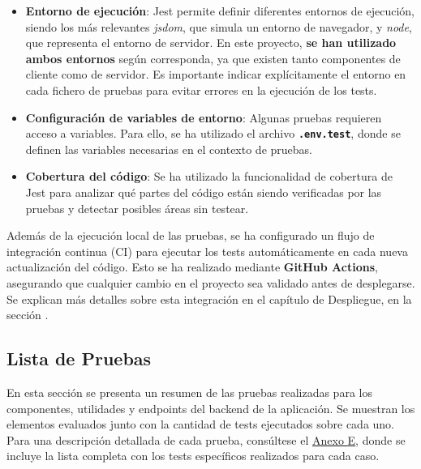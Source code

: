 \begin{itemize}
    \item \textbf{Entorno de ejecución}: Jest permite definir diferentes entornos de ejecución, siendo los más relevantes \textit{jsdom}, que simula un entorno de navegador, y \textit{node}, que representa el entorno de servidor. En este proyecto, \textbf{se han utilizado ambos entornos} según corresponda, ya que existen tanto componentes de cliente como de servidor. Es importante indicar explícitamente el entorno en cada fichero de pruebas para evitar errores en la ejecución de los tests.

    \item \textbf{Configuración de variables de entorno}: Algunas pruebas requieren acceso a variables. Para ello, se ha utilizado el archivo \textbf{\texttt{.env.test}}, donde se definen las variables necesarias en el contexto de pruebas.

    \item \textbf{Cobertura del código}: Se ha utilizado la funcionalidad de cobertura de Jest para analizar qué partes del código están siendo verificadas por las pruebas y detectar posibles áreas sin testear.
\end{itemize}

Además de la ejecución local de las pruebas, se ha configurado un flujo de integración continua (CI) para ejecutar los tests automáticamente en cada nueva actualización del código. Esto se ha realizado mediante \textbf{GitHub Actions}, asegurando que cualquier cambio en el proyecto sea validado antes de desplegarse. Se explican más detalles sobre esta integración en el capítulo de Despliegue, en la sección .

\subsection{Lista de Pruebas}

En esta sección se presenta un resumen de las pruebas realizadas para los componentes, utilidades y endpoints del backend de la aplicación. Se muestran los elementos evaluados junto con la cantidad de tests ejecutados sobre cada uno. Para una descripción detallada de cada prueba, consúltese el \hyperref[ch:anexoE]{Anexo E}, donde se incluye la lista completa con los tests específicos realizados para cada caso.

